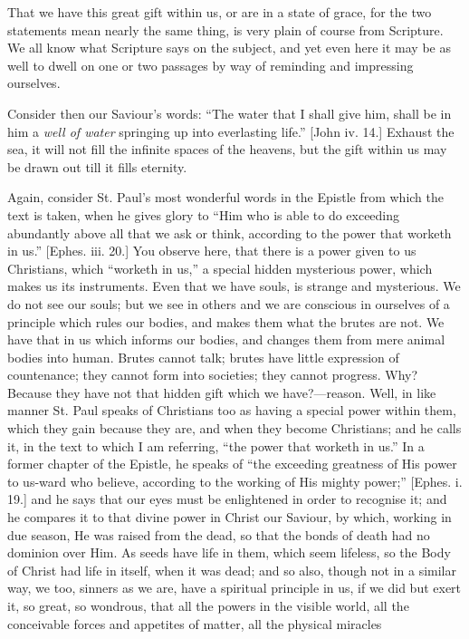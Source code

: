 That we have this great gift within us, or are in a state of grace,
for the two statements mean nearly the same thing, is very plain of
course from Scripture. We all know what Scripture says on the subject,
and yet even here it may be as well to dwell on one or two passages by
way of reminding and impressing ourselves.

Consider then our Saviour's words: ``The water that I shall
give him, shall be in him a \emph{well of water} springing up into
everlasting life.'' [John iv. 14.] Exhaust the sea, it will not
fill the infinite spaces of the heavens, but the gift within us may be
drawn out till it fills eternity.

Again, consider St. Paul's most wonderful words in the Epistle from
which the text is taken, when he gives glory to ``Him who is able
to do exceeding abundantly above all that we ask or think, according
to the power that worketh in us.'' [Ephes. iii. 20.] You observe
here, that there is a power given to us Christians, which ``worketh
in us,'' a special hidden mysterious power, which makes us its
instruments. Even that we have souls, is strange and mysterious. We do
not see our souls; but we see in others and we are conscious in
ourselves of a principle which rules our bodies, and makes them what
the brutes are not. We have that in us which informs our bodies, and
changes them from mere animal bodies into human. Brutes cannot talk;
brutes have little expression of countenance; they cannot form into
societies; they cannot progress. Why? Because they have not that
hidden gift which we have?—reason. Well, in like manner St. Paul
speaks of Christians too as having a special power within them, which
they gain because they are, and when they become Christians; and he
calls it, in the text to which I am referring, ``the power that
worketh in us.'' In a former chapter of the Epistle, he speaks of
``the exceeding greatness of His power to us-ward who believe,
according to the working of His mighty power;'' [Ephes. i. 19.]
and he says that our eyes must be enlightened in order to recognise
it; and he compares it to that divine power in Christ our Saviour, by
which, working in due season, He was raised from the dead, so that the
bonds of death had no dominion over Him. As seeds have life in them,
which seem lifeless, so the Body of Christ had life in itself, when it
was dead; and so also, though not in a similar way, we too, sinners as
we are, have a spiritual principle in us, if we did but exert it, so
great, so wondrous, that all the powers in the visible world, all the
conceivable forces and appetites of matter, all the physical miracles
